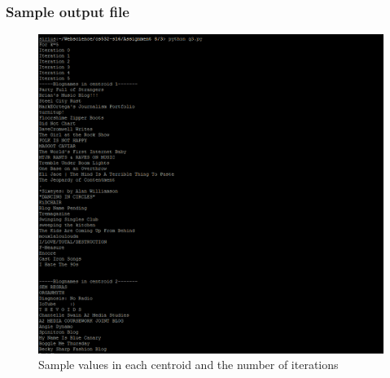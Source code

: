 \subsubsection{Sample output file}
\begin{figure}[ht]    
    \begin{center}
        \includegraphics[scale=0.7]{output_q3.png}
        \caption{Sample values in each centroid and the number of iterations}
        \label{Sample3t1}
    \end{center}
\end{figure}
\newpage
